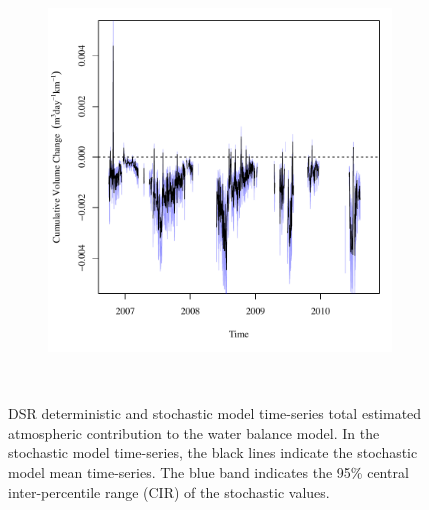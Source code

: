 \begin{linenumbers}
\begin{landscape}
\begin{figure}
\begin{subfigure}{0.7\textwidth}
			\includegraphics[width=\tableCustomSize]{"Figures/Results_DSR/Stochastic/Balance Water - atm"}
		\end{subfigure}\\
		\caption[DSR deterministic and stochastic model time-series total estimated atmospheric contribution to the water balance model.]{DSR deterministic and stochastic model time-series total estimated atmospheric contribution to the water balance model.  In the stochastic model time-series, the black lines indicate the stochastic model mean time-series.  The blue band indicates the 95\% central inter-percentile range (CIR) of the stochastic values.}
		\label{fig:reachAtm_DS}
	\end{figure}
\end{landscape}


\end{linenumbers}
